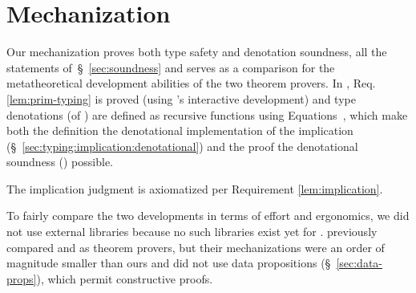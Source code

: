 \section{\coq Mechanization}
\label{sec:coq}

Our \coq mechanization 
proves both type safety and
denotation soundness, \ie all the statements of~\S~\ref{sec:soundness}
and serves as a comparison for the metatheoretical 
development abilities of the two theorem provers. 
%
%
In \coq, 
Req. \ref{lem:prim-typing} 
is proved (using \coq's interactive development)
and type denotations (of )
are defined as recursive functions using 
Equations~\cite{10.1145/3341690}, 
which make both the 
definition the denotational implementation
of the implication (\S~\ref{sec:typing:implication:denotational})
and the proof  
the denotational soundness ()
possible. 
\begin{fullversion}
    The implication judgment
    is  axiomatized per Requirement \ref{lem:implication}.
\end{fullversion}
%
To fairly compare the two developments
in terms of effort and ergonomics,
we did not use external \coq libraries 
because no such libraries exist yet for \lh.
%
\citet{Vazou17} previously compared \lh and \coq 
as theorem provers, but their mechanizations were an order of magnitude
smaller than ours and did not use data propositions (\S~\ref{sec:data-props}),
which permit constructive \lh proofs. 

